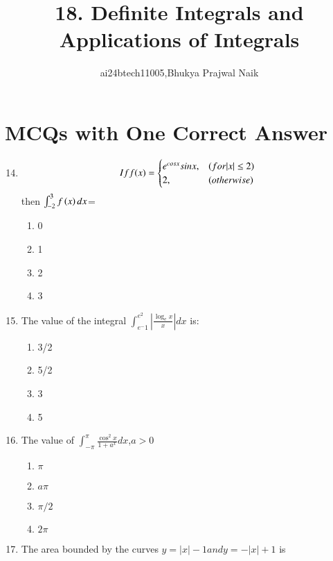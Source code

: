 \documentclass[journal,12pt,twocolumn]{IEEEtran}
\theoremstyle{remark}
\begin{document}

\vspace{3cm}

\title{18. Definite Integrals and Applications of Integrals}
\author{ai24btech11005,Bhukya Prajwal Naik}
\maketitle
\section{MCQs with One Correct Answer}

\begin{enumerate}
\setcounter{enumi}{13}   
\item
\begin{equation}
If f(x) = 
\begin{cases}
    e^{cosx}sinx,& \text(for |x|\leq2)\\
    2,& \text(otherwise)\\
\end{cases}\end{equation}
then $\int_{-2}^{3}f\left(x\right) dx$=
\begin{enumerate}
    \item 0
    \item 1
    \item 2
    \item 3
    \hfill{}
\end{enumerate}
\item The value of the integral $\int_{e^-1}^{e^2}\left|\frac{\log_e x}{x}\right| dx$ is:
\begin{enumerate}
    \item 3/2
    \item 5/2
    \item  3
    \item  5
    \hfill{}
\end{enumerate}
\item The value of $\int_{-\pi}^{\pi}\frac{\cos^2 x}{1+a^ x } dx$,$a>0$
\begin{enumerate}
    \item$\pi$
    \item $a\pi$
    \item $\pi/2$
    \item $2\pi$
    \hfill{}
\end{enumerate}
\item The area bounded by the curves $y=|x|-1 and y=-|x|+1$ is
\begin{enumerate}

\end{enumerate}
\end{enumerate}
\end{document}
